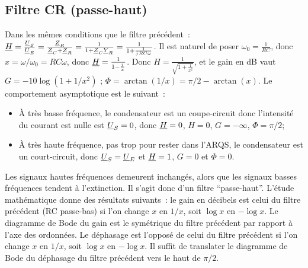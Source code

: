 \subsection{Filtre CR (passe-haut)}
Dans les mêmes conditions que le filtre précédent~: $\underline{H} = \frac{\underline{U}_S}{\underline{U}_E} = \frac{\underline{Z}_R}{\underline{Z}_C + \underline{Z}_R} = \frac{1}{1+\underline{Z}_C\underline{Y}_R} = \frac{1}{1+\frac{1}{{j\mkern1mu} R C \omega}}$. Il est naturel de poser $\omega_0=\frac{1}{RC}$, donc $x=\omega/\omega_0=RC\omega$, donc $\underline{H} = \frac{1}{1-\frac{{j\mkern1mu}}{x}}$. Donc $H = \frac{1}{\sqrt{1+\frac{1}{x^2}}}$, et le gain en \si{\dB} vaut $G = -10\log(1+1/x^2)$ ; $\Phi = \arctan(1/x) = \pi/2 - \arctan(x)$. Le comportement asymptotique est le suivant~:
\begin{itemize}
	\item À très basse fréquence, le condensateur est un coupe-circuit donc l'intensité du courant est nulle est $\underline{U}_S = 0$, donc $\underline{H}=0$, $H=0$, $G=-\infty$, $\Phi=\pi/2$;
	\item À très haute fréquence, pas trop pour rester dans l'ARQS, le condensateur est un court-circuit, donc $\underline{U}_S=\underline{U}_E$ et $\underline{H}=1$, $G=0$ et $\Phi=0$.
\end{itemize}
Les signaux hautes fréquences demeurent inchangés, alors que les signaux basses fréquences tendent à l'extinction. Il s'agit donc d'un filtre ``passe-haut''. L'étude mathématique donne des résultats suivants~: le gain en décibels est celui du filtre précédent (RC passe-bas) si l'on change $x$ en $1/x$, soit $\log x$ en $-\log x$. Le diagramme de Bode du gain est le symétrique du filtre précédent par rapport à l'axe des ordonnées. Le déphasage est l'opposé de celui du filtre précédent si l'on change $x$ en $1/x$, soit $\log x$ en $-\log x$. Il suffit de translater le diagramme de Bode du déphasage du filtre précédent vers le haut de $\pi/2$.

